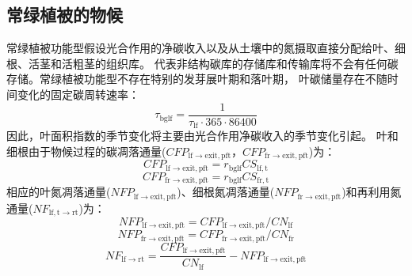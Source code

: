 \subsection{常绿植被的物候}\label{常绿植被的物候}
常绿植被功能型假设光合作用的净碳收入以及从土壤中的氮摄取直接分配给叶、细根、活茎和活粗茎的组织库。
代表非结构碳库的存储库和传输库将不会有任何碳存储。常绿植被功能型不存在特别的发芽展叶期和落叶期，
叶碳储量存在不随时间变化的固定碳周转速率：
\begin{equation}
  \tau_{\mathrm{bglf}}=\frac{1}{\tau_{\mathrm{lf}} \cdot 365 \cdot 86400}
\end{equation}
因此，叶面积指数的季节变化将主要由光合作用净碳收入的季节变化引起。
叶和细根由于物候过程的碳凋落通量($CFP_{\mathrm{lf\rightarrow exit,pft}}$，$CFP_{\mathrm{fr\rightarrow exit,pft}}$)为：
\begin{equation}
  CFP_{\mathrm{lf\rightarrow exit,pft}}=r_{\mathrm{bglf}} CS_{\mathrm{lf,t}}
\end{equation}
\begin{equation}
  CFP_{\mathrm{fr\rightarrow exit,pft}}=r_{\mathrm{bglf}} CS_{\mathrm{fr,t}}
\end{equation}
相应的叶氮凋落通量($NFP_{\mathrm{lf\rightarrow exit,pft}}$)、细根氮凋落通量($NFP_{\mathrm{fr\rightarrow exit,pft}}$)和再利用氮通量($NF_{\mathrm{lf,t\rightarrow rt}}$)为：
\begin{equation}
  N FP_{\mathrm{lf\rightarrow exit,pft}}=CFP_{\mathrm{lf\rightarrow exit,pft}} / CN_{\mathrm{lf}}
\end{equation}
\begin{equation}
  N FP_{\mathrm{fr\rightarrow exit,pft}}=CFP_{\mathrm{fr\rightarrow exit,pft}} / CN_{\mathrm{fr}}
\end{equation}
\begin{equation}
  N F_{\mathrm{lf\rightarrow rt}}=\frac{CFP_{\mathrm{lf\rightarrow exit,pft }}}{CN_{\mathrm{lf}}}-NFP_{\mathrm{lf\rightarrow exit,pft}}
\end{equation}



